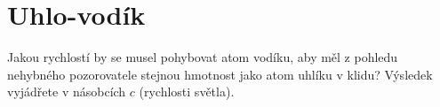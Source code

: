 \documentclass[crop=false]{standalone}
\begin{document}
\section*{Uhlo-vodík}
Jakou rychlostí by se musel pohybovat atom vodíku, aby měl z pohledu nehybného pozorovatele stejnou hmotnost jako atom uhlíku v klidu? Výsledek vyjádřete v násobcích $c$ (rychlosti světla).
\end{document}
